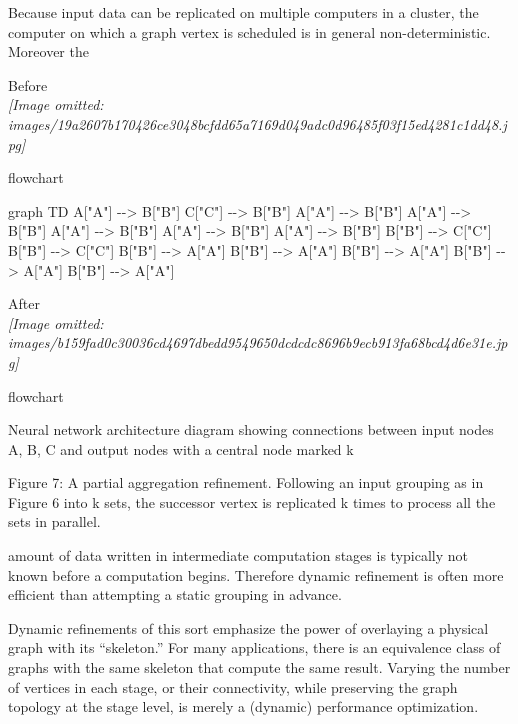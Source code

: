 \documentclass[
]{article}
\newenvironment{Shaded}{}{}
\newcommand{\NormalTok}[1]{#1}
\begin{document}
Because input data can be replicated on multiple computers in a cluster,
the computer on which a graph vertex is scheduled is in general
non-deterministic. Moreover the

Before\\
\textit{[Image omitted: images/19a2607b170426ce3048bcfdd65a7169d049adc0d96485f03f15ed4281c1dd48.jpg]}

flowchart

\begin{Shaded}
\begin{Highlighting}[]
\NormalTok{graph TD}
\NormalTok{    A["A"] {-}{-}\textgreater{} B["B"]}
\NormalTok{    C["C"] {-}{-}\textgreater{} B["B"]}
\NormalTok{    A["A"] {-}{-}\textgreater{} B["B"]}
\NormalTok{    A["A"] {-}{-}\textgreater{} B["B"]}
\NormalTok{    A["A"] {-}{-}\textgreater{} B["B"]}
\NormalTok{    A["A"] {-}{-}\textgreater{} B["B"]}
\NormalTok{    A["A"] {-}{-}\textgreater{} B["B"]}
\NormalTok{    B["B"] {-}{-}\textgreater{} C["C"]}
\NormalTok{    B["B"] {-}{-}\textgreater{} C["C"]}
\NormalTok{    B["B"] {-}{-}\textgreater{} A["A"]}
\NormalTok{    B["B"] {-}{-}\textgreater{} A["A"]}
\NormalTok{    B["B"] {-}{-}\textgreater{} A["A"]}
\NormalTok{    B["B"] {-}{-}\textgreater{} A["A"]}
\NormalTok{    B["B"] {-}{-}\textgreater{} A["A"]}
\end{Highlighting}
\end{Shaded}

After\\
\textit{[Image omitted: images/b159fad0c30036cd4697dbedd9549650dcdcdc8696b9ecb913fa68bcd4d6e31e.jpg]}

flowchart

Neural network architecture diagram showing connections between input
nodes A, B, C and output nodes with a central node marked k

Figure 7: A partial aggregation refinement. Following an input grouping
as in Figure 6 into k sets, the successor vertex is replicated k times
to process all the sets in parallel.

amount of data written in intermediate computation stages is typically
not known before a computation begins. Therefore dynamic refinement is
often more efficient than attempting a static grouping in advance.

Dynamic refinements of this sort emphasize the power of overlaying a
physical graph with its ``skeleton.'' For many applications, there is an
equivalence class of graphs with the same skeleton that compute the same
result. Varying the number of vertices in each stage, or their
connectivity, while preserving the graph topology at the stage level, is
merely a (dynamic) performance optimization.
\end{document}
